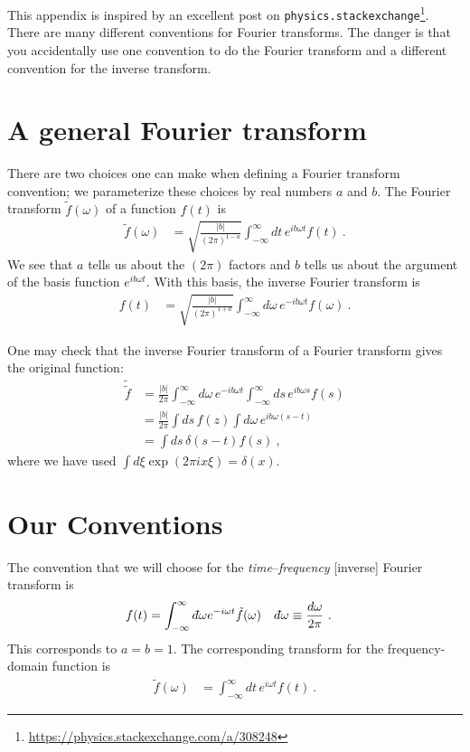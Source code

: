 \documentclass[
  11pt,
	colorful,
	raggedright,
]{tufte-style-thesis-flip}
\renewcommand{\dbar}{d\hspace*{-0.08em}\bar{}\hspace*{0.1em}}
\begin{document}
This appendix is inspired by an excellent post on \texttt{physics.stackexchange}\footnote{\url{https://physics.stackexchange.com/a/308248}}. There are many different conventions for Fourier transforms. The danger is that you accidentally use one convention to do the Fourier transform and a different convention for the inverse transform. 

\section{A general Fourier transform}

There are two choices one can make when defining a Fourier transform convention; we parameterize these choices by real numbers $a$ and $b$. The Fourier transform $\tilde f(\omega)$ of a function $f(t)$ is
\begin{align}
  \tilde f(\omega)
  &= 
  \sqrt{\frac{|b|}{(2\pi)^{1-a}}}
  \int_{-\infty}^\infty dt\, e^{ib\omega t} f(t) \ .
\end{align}
We see that $a$ tells us about the $(2\pi)$ factors and $b$ tells us about the argument of the basis function $e^{ib\omega t}$. With this basis, the inverse Fourier transform is 
\begin{align}
  f(t)&=
  \sqrt{\frac{|b|}{(2\pi)^{1+a}}}
  \int_{-\infty}^\infty d\omega\, e^{-ib\omega t} f(\omega) \ .
\end{align}

One may check that the inverse Fourier transform of a Fourier transform gives the original function:
\begin{align}
  \tilde{\tilde f} &=
  \frac{|b|}{2\pi}
  \int_{-\infty}^\infty d\omega\, e^{-ib\omega t}
  \int_{-\infty}^{\infty}
  ds\, e^{ib\omega s} f(s)
  \\
  &= 
  \frac{|b|}{2\pi}
  \int ds\, f(z) \int d\omega \, e^{ib\omega(s-t)}
  \\
  &= \int ds\, \delta(s-t) f(s) \ ,
\end{align}
where we have used $\int d\xi \exp(2\pi i x\xi) = \delta(x)$. 

\section{Our Conventions}

The convention that we will choose for the \emph{time}--\emph{frequency} [inverse] Fourier transform is
\begin{align}
  f(t) &= \int_{-\infty}^{\infty} \dbar\omega e^{-i\omega t} \tilde f(\omega)
  &
  \dbar \omega &\equiv\frac{d\omega}{2\pi} \ .
\end{align}
This corresponds to $a=b=1$. The corresponding transform for the frequency-domain function is
\begin{align}
  \tilde f(\omega) &= 
  \int_{-\infty}^\infty d t\, e^{i\omega t} f(t) \ .
  \label{eq:inverse:fourier:convention}
\end{align}
\end{document}
